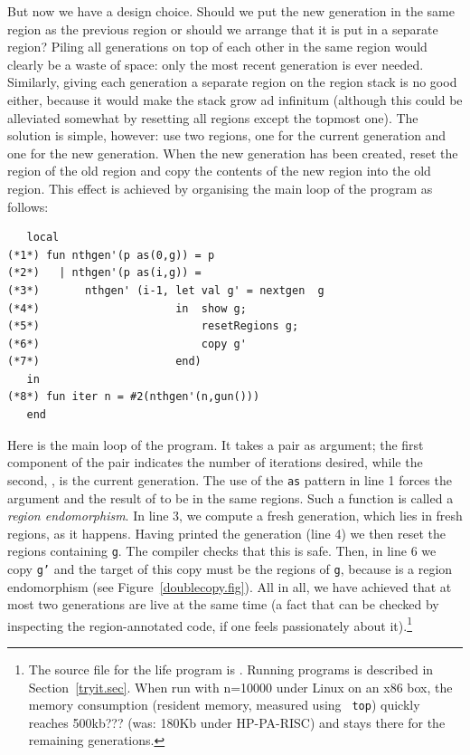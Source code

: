 \documentclass[12pt]{book}
\begin{document}
But now we have a design choice. Should we put the new generation in
the same region as the previous region or should we arrange that it is
put in a separate region? Piling all generations on top of each other
in the same region would clearly be a waste of space: only the most
recent generation is ever needed. Similarly, giving each generation a
separate region on the region stack is no good either, because it
would make the stack grow ad infinitum (although this could be
alleviated somewhat by resetting all regions except the topmost one).
The solution is simple, however: use two regions, one for the current
generation and one for the new generation. When the new generation has
been created, reset the region of the old region and copy the contents
of the new region into the old region. This effect is achieved by
organising the main loop of the program as follows:
\begin{verbatim}
   local 
(*1*) fun nthgen'(p as(0,g)) = p 
(*2*)   | nthgen'(p as(i,g)) = 
(*3*)       nthgen' (i-1, let val g' = nextgen  g
(*4*)                     in  show g;
(*5*)                         resetRegions g;
(*6*)                         copy g'
(*7*)                     end)
   in 
(*8*) fun iter n = #2(nthgen'(n,gun()))
   end
\end{verbatim}
Here  
%
is the main loop of the program. It takes a pair as argument; the
first component of the pair indicates the number of iterations
desired, while the second, , is the current generation. The
use of the {\tt as} pattern in line 1 forces the argument and the
result of  to be in the same regions. Such a function
is called a
%
{\em region endomorphism}. In line 3, we compute a fresh generation,
which lies in fresh regions, as it happens. Having printed the
generation (line 4) we then reset the regions containing {\tt g}. The
compiler checks that this is safe. Then, in line 6 we copy {\tt g'}
and the target of this copy must be the regions of {\tt g}, because
 is a region endomorphism (see
Figure~\ref{doublecopy.fig}).  All in all, we have achieved that at
most two generations are live at the same time (a fact that can be
checked by inspecting the region-annotated code, if one feels
passionately about it).\footnote{The source file for the life program
  is . Running programs is described in
  Section~\ref{tryit.sec}. When run with n=10000 under Linux on an x86
  box, the memory consumption (resident memory, measured using {\tt
    top}) quickly reaches 500kb??? (was: 180Kb under HP-PA-RISC) and
  stays there for the remaining generations.}
\end{document}
